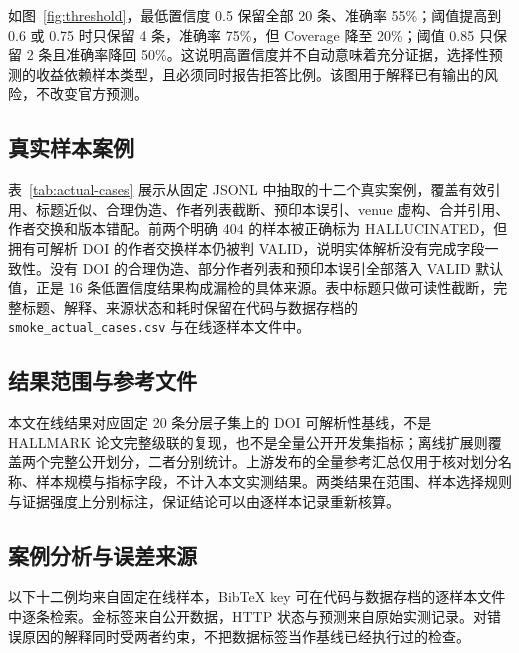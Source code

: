 \documentclass[UTF8,a4paper,11pt]{ctexart}
\begin{document}
如图~\ref{fig:threshold}，最低置信度 0.5 保留全部 20 条、准确率 55\%；阈值提高到 0.6 或 0.75 时只保留 4 条，准确率 75\%，但 Coverage 降至 20\%；阈值 0.85 只保留 2 条且准确率降回 50\%。这说明高置信度并不自动意味着充分证据，选择性预测的收益依赖样本类型，且必须同时报告拒答比例。该图用于解释已有输出的风险，不改变官方预测。

\subsection{真实样本案例}

表~\ref{tab:actual-cases} 展示从固定 JSONL 中抽取的十二个真实案例，覆盖有效引用、标题近似、合理伪造、作者列表截断、预印本误引、venue 虚构、合并引用、作者交换和版本错配。前两个明确 404 的样本被正确标为 HALLUCINATED，但拥有可解析 DOI 的作者交换样本仍被判 VALID，说明实体解析没有完成字段一致性。没有 DOI 的合理伪造、部分作者列表和预印本误引全部落入 VALID 默认值，正是 16 条低置信度结果构成漏检的具体来源。表中标题只做可读性截断，完整标题、解释、来源状态和耗时保留在代码与数据存档的 \texttt{smoke\_actual\_cases.csv} 与在线逐样本文件中。



\subsection{结果范围与参考文件}

本文在线结果对应固定 20 条分层子集上的 DOI 可解析性基线，不是 HALLMARK 论文完整级联的复现，也不是全量公开开发集指标；离线扩展则覆盖两个完整公开划分，二者分别统计。上游发布的全量参考汇总仅用于核对划分名称、样本规模与指标字段，不计入本文实测结果。两类结果在范围、样本选择规则与证据强度上分别标注，保证结论可以由逐样本记录重新核算。

\subsection{案例分析与误差来源}

以下十二例均来自固定在线样本，BibTeX key 可在代码与数据存档的逐样本文件中逐条检索。金标签来自公开数据，HTTP 状态与预测来自原始实测记录。对错误原因的解释同时受两者约束，不把数据标签当作基线已经执行过的检查。
\end{document}

